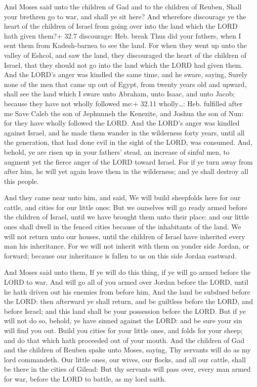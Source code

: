  And Moses said unto the children of Gad and to the
children of Reuben, Shall your brethren go to war, and shall ye sit
here?  And wherefore discourage ye the heart of the children
of Israel from going over into the land which the LORD hath given them?+
32.7 discourage: Heb. break  Thus did your fathers, when I
sent them from Kadesh-barnea to see the land.  For when they
went up unto the valley of Eshcol, and saw the land, they discouraged
the heart of the children of Israel, that they should not go into the
land which the LORD had given them.  And the LORD's anger
was kindled the same time, and he sware, saying,  Surely
none of the men that came up out of Egypt, from twenty years old and
upward, shall see the land which I sware unto Abraham, unto Isaac, and
unto Jacob; because they have not wholly followed me:+ 32.11
wholly\ldots: Heb. fulfilled after me  Save Caleb the son
of Jephunneh the Kenezite, and Joshua the son of Nun: for they have
wholly followed the LORD.  And the LORD's anger was kindled
against Israel, and he made them wander in the wilderness forty years,
until all the generation, that had done evil in the sight of the LORD,
was consumed.  And, behold, ye are risen up in your
fathers' stead, an increase of sinful men, to augment yet the fierce
anger of the LORD toward Israel.  For if ye turn away from
after him, he will yet again leave them in the wilderness; and ye shall
destroy all this people.

 And they came near unto him, and said, We will build
sheepfolds here for our cattle, and cities for our little ones:
 But we ourselves will go ready armed before the children
of Israel, until we have brought them unto their place: and our little
ones shall dwell in the fenced cities because of the inhabitants of the
land.  We will not return unto our houses, until the
children of Israel have inherited every man his inheritance.
 For we will not inherit with them on yonder side Jordan,
or forward; because our inheritance is fallen to us on this side Jordan
eastward.

 And Moses said unto them, If ye will do this thing, if
ye will go armed before the LORD to war,  And will go all
of you armed over Jordan before the LORD, until he hath driven out his
enemies from before him,  And the land be subdued before
the LORD: then afterward ye shall return, and be guiltless before the
LORD, and before Israel; and this land shall be your possession before
the LORD.  But if ye will not do so, behold, ye have sinned
against the LORD: and be sure your sin will find you out. 
Build you cities for your little ones, and folds for your sheep; and do
that which hath proceeded out of your mouth.  And the
children of Gad and the children of Reuben spake unto Moses, saying, Thy
servants will do as my lord commandeth.  Our little ones,
our wives, our flocks, and all our cattle, shall be there in the cities
of Gilead:  But thy servants will pass over, every man
armed for war, before the LORD to battle, as my lord saith.

